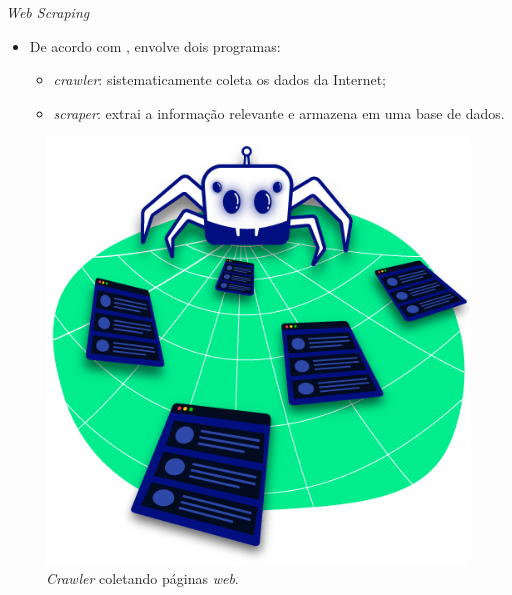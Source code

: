 \documentclass{beamer}
\begin{document}
    \begin{frame}{\textit{Web Scraping}}
        \begin{itemize}
            \justifying
            \vspace{0.1cm}
            \item De acordo com \citet{lawson2015,patil2016}, envolve dois programas:
            \vspace{0.1cm}
            \begin{itemize}
                \item \textit{crawler}: sistematicamente coleta os dados da Internet;
                \item \textit{scraper}: extrai a informação relevante e armazena em uma base de dados.
            \end{itemize}
        \end{itemize}
        
        \begin{figure}
            \centering
            \includegraphics[scale=0.16]{figuras/spider_crawler.png}
	        \caption{\textit{Crawler} coletando páginas \textit{web}.}
        \end{figure}
    \end{frame}
\end{document}
